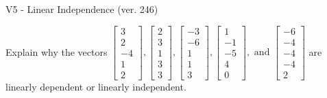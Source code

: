 \begin{exercise}
  \begin{exerciseTitle}V5 - Linear Independence (ver. 246)\end{exerciseTitle}
  \begin{exerciseStatement}
    Explain why the vectors \(\left[\begin{array}{r}
3 \\
2 \\
-4 \\
1 \\
2
\end{array}\right] , \left[\begin{array}{r}
2 \\
3 \\
1 \\
3 \\
3
\end{array}\right] , \left[\begin{array}{r}
-3 \\
-6 \\
1 \\
1 \\
3
\end{array}\right] , \left[\begin{array}{r}
1 \\
-1 \\
-5 \\
4 \\
0
\end{array}\right] , \text{ and } \left[\begin{array}{r}
-6 \\
-4 \\
-4 \\
-4 \\
2
\end{array}\right]\) are linearly dependent or linearly independent.	



\end{exerciseStatement}
\end{exercise}
